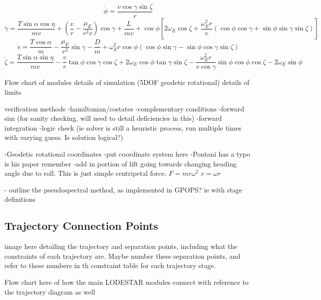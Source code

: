 \begin{equation}
\dot{\phi} = \frac{v\cos\gamma\sin\zeta}{r}
\end{equation}
\begin{equation}
\dot{\gamma} = \frac{T\sin\alpha \cos\eta}{mv} + (\frac{v}{r}-\frac{\mu_E}{r^2 v})\cos\gamma + \frac{L}{mv}
+ \cos\phi[2\omega_E \cos\zeta + \frac{\omega_E^2 r}{v}(\cos\phi\cos\gamma+\sin\phi\sin\gamma\sin\zeta)]
\end{equation}
\begin{equation}
\dot{v} = \frac{T\cos\alpha}{m}-\frac{\mu_E}{r^2}\sin\gamma - \frac{D}{m}
+ \omega_E^2 r\cos\phi(\cos\phi\sin\gamma-\sin\phi\cos\gamma\sin\zeta)
\end{equation}
\begin{equation}
\dot{\zeta} = \frac{T\sin\alpha \sin\eta}{mv}-\frac{v}{r}\tan\phi\cos\gamma\cos\zeta +2\omega_E\cos\phi\tan\gamma\sin\zeta - \frac{\omega_E^2 r}{v\cos\gamma}\sin\phi\cos\phi\cos\zeta-2\omega_E\sin\phi 
\end{equation}



	Flow chart of modules
	details of simulation (5DOF geodetic rotational)
	details of limits
	
	verification methods
	-hamiltonian/costates
	-complementary conditions
	-forward sim (for sanity checking, will need to detail deficiencies in this)
	-forward integration
	-logic check (ie solver is still a heuristic process, run multiple times with varying guess. Is solution logical?)

-Geodetic rotational coordinates 
-put coordinate system here
-Pontani has a typo is his paper remember
-add in portion of lift going towards changing heading angle due to roll. This is just simple centripetal force. 
$F=mr\omega^2$ $v=\omega r$



- outline the pseudospectral method, as implemented in GPOPS? ie with stage definitions

\subsection{Trajectory Connection Points}
image here detailing the trajectory and separation points, including what the constraints of each trajectory are. Maybe number these separation points, and refer to these numbers in th constraint table for each trajectory stage. 

Flow chart here of how the main LODESTAR modules connect with reference to the trajectory diagram as well

